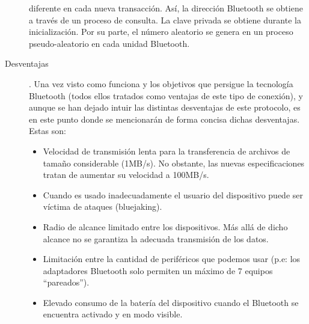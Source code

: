 \begin{description}
diferente en cada nueva transacción.
Así, la dirección Bluetooth se obtiene a través de un proceso de consulta. 
La clave privada se obtiene durante la inicialización. Por su parte, el 
número aleatorio se genera en un proceso pseudo-aleatorio en cada unidad 
Bluetooth.
\item[Desventajas].
Una vez visto como funciona y los objetivos que persigue la tecnología 
Bluetooth (todos ellos tratados como ventajas de este tipo de conexión), y 
aunque se han dejado intuir las distintas desventajas de este protocolo, es 
en este punto donde se mencionarán de forma concisa dichas desventajas. 
Estas son:
\begin{itemize}
\item Velocidad de transmisión lenta para la transferencia de archivos de 
tamaño considerable (1MB/s). No obstante, las nuevas especificaciones tratan 
de aumentar su velocidad a 100MB/s.
\item Cuando es usado inadecuadamente el usuario del dispositivo puede ser
víctima de ataques (bluejaking).
\item Radio de alcance limitado entre los dispositivos. Más allá de dicho 
alcance no se garantiza la adecuada transmisión de los datos.
\item Limitación entre la cantidad de periféricos que podemos usar (p.e: los
adaptadores Bluetooth solo permiten un máximo de 7 equipos “pareados”).
\item Elevado consumo de la batería del dispositivo cuando el Bluetooth se
encuentra activado y en modo visible.
\end{itemize}

\end{description}

